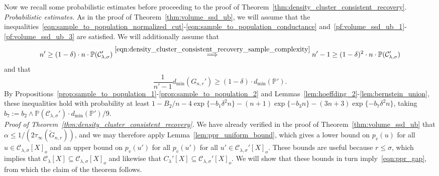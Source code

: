 \documentclass[twoside,11pt]{article}
\newcommand{\1}{\mathbf{1}}
\newcommand{\mc}[1]{\mathcal{#1}}
\newcommand{\Pbb}{\mathbb{P}}
\newcommand{\wt}[1]{\widetilde{#1}}
\begin{document}
Now we recall some probabilistic estimates before proceeding to the proof of Theorem~\ref{thm:density_cluster_consistent_recovery}.\\

\noindent \emph{Probabilistic estimates.}
As in the proof of Theorem~\ref{thm:volume_ssd_ub}, we will assume that the inequalities~\eqref{eqn:sample_to_population_normalized_cut}-\eqref{eqn:sample_to_population_conductance} and~\eqref{pf:volume_ssd_ub_1}-\eqref{pf:volume_ssd_ub_3} are satisfied. We will additionally assume that
\begin{equation}
n' \geq (1 - \delta) \cdot n \cdot \Pbb(\mc{C}_{\lambda,\sigma}') \overset{\eqref{eqn:density_cluster_consistent_recovery_sample_complexity}}{\Longrightarrow} n' - 1 \geq (1 - \delta)^2 \cdot n \cdot \Pbb(\mc{C}_{\lambda,\sigma}')
\end{equation}
and that 
\begin{equation}
\frac{1}{n' - 1} d_{\min}(G_{n,r}') \geq (1 - \delta) \cdot d_{\min}(\Pbb').
\end{equation}
By Propositions~\ref{prop:sample_to_population_1}-\ref{prop:sample_to_population_2} and Lemmas~\ref{lem:hoeffding_2}-\ref{lem:bernstein_union}, these inequalities hold with probability at least $1 - B_2/n - 4\exp\{-b_1\delta^2n\} - (n + 1)\exp\{-b_3n\} - (3n + 3)\exp\{-b_7\delta^2n\}$, taking $b_7 := b_2 \wedge \Pbb(\mc{C}_{\lambda,\sigma}') \cdot d_{\min}(\Pbb')/9$.\\

\noindent \emph{Proof of Theorem~\ref{thm:density_cluster_consistent_recovery}.}
We have already verified in the proof of Theorem~\ref{thm:volume_ssd_ub} that $\alpha \leq 1/(2\tau_{\infty}(\wt{G}_{n,r}))$, and we may therefore apply Lemma~\ref{lem:ppr_uniform_bound}, which gives a lower bound on $p_v(u)$ for all $u \in \mc{C}_{\lambda,\sigma}[X]_o$ and an upper bound on $p_v(u')$ for all $p_v(u')$ for all $u' \in \mc{C}_{\lambda,\sigma}'[X]_o$. These bounds are useful because $r \leq \sigma$, which implies that $\mc{C}_{\lambda}[X] \subseteq\mc{C}_{\lambda,\sigma}[X]_o$ and likewise that $C_{\lambda}'[X] \subseteq\mc{C}_{\lambda,\sigma}'[X]_o$. We will show that these bounds in turn imply~\eqref{eqn:ppr_gap}, from which the claim of the theorem follows.
\end{document}
